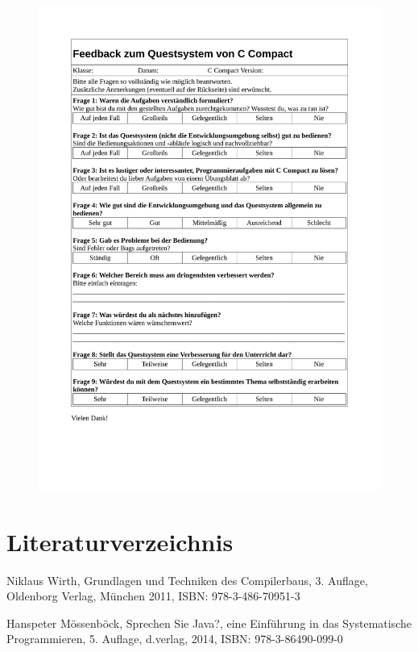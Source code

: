 \documentclass[11pt, oneside]{book}   		%
\begin{document}
\begin{figure}[h!]
	\centering
	\includegraphics[width=1.0\textwidth]{./media/docs/Fragebogen-quest.pdf}
	\label{fig:app-doc-fb-quest}
\end{figure}

	

%


\chapter{Literaturverzeichnis}

Niklaus Wirth, Grundlagen und Techniken des Compilerbaus, 3. Auflage, Oldenborg Verlag, München 2011, 
ISBN: 978-3-486-70951-3

Hanspeter Mössenböck, Sprechen Sie Java?, eine Einführung in das Systematische Programmieren, 5. Auflage, d.verlag, 2014, ISBN: 978-3-86490-099-0


\end{document}
